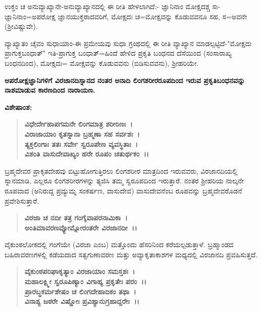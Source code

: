 ಉಕ್ತಂ ಚ ಅನುವ್ಯಾಖ್ಯಾನೇ-ಅನುವ್ಯಾಖ್ಯಾನದಲ್ಲಿ ಈ ರೀತಿ ಹೇಳಲಾಗಿದೆ:- ಜ್ಞಾನಿನಾಂ ಮೋಕ್ಷದಶ್ಚ ಸಃ- ಜ್ಞಾನಿನಾಂ=ಅಪರೋಕ್ಷ ಜ್ಞಾನಯುಕ್ತರಾದವರಿಗೆ, ಮೋಕ್ಷದಃ ಚ=ಮೋಕ್ಷವನ್ನು ಕೊಡುವವನೂ ಸಹ, ಸ=ಅವನೇ (ಶ‍್ರೀವಿಷ್ಣುವೇ).

ವ್ಯಾಖ್ಯಾತಂ ಚೈವಂ ಸುಧಾಯಾಂ-ಈ ಪ್ರಮೇಯವು ಸುಧಾ ಗ್ರಂಥದಲ್ಲಿ ಈ ರೀತಿ ವ್ಯಾಖ್ಯಾನ ಮಾಡಲ್ಪಟ್ಟಿದೆ-"ಮೋಕ್ಷದಃ ಪ್ರಾಗುಕ್ತಬಂಧಾತ್" ಇತಿ-ಪ್ರಾಗುಕ್ತ ಬಂಧಾತ್=ಹಿಂದೆ ಹೇಳಿದ ಪ್ರಕೃತಿ ಬಂಧನದ ದೆಸೆಯಿಂದ (ಸಂಸಾರಾಖ್ಯ ಬಂಧನದಿಂದ), ಮೋಕ್ಷದಃ= ಮೋಕ್ಷವನ್ನು ಕೊಡುವವನು (ಬಿಡಿಸುವವನು), ಶ‍್ರೀಹರಿಯೇ.

\begin{center}
\textbf{ಅಪರೋಕ್ಷಜ್ಞಾನಿಗಳಿಗೆ ವಿರಜಾನದಿಸ್ನಾನದ ನಂತರ ಅನಾದಿ ಲಿಂಗಶರೀರರೂಪದಿಂದ ಇರುವ ಪ್ರಕೃತಿಬಂಧನವನ್ನು ನಾಶಮಾಡುವ ಕಾರಣದಿಂದ ನಾರಾಯಣ.}
\end{center}

\noindent
\textbf{ವಿಶೇಷಾಂಶ:\enginline{-}}

\begin{verse}
\textbf{ವಿಧೇರ್ದೇಹಾಪಗಮನೇ ಲಿಂಗಮಾತ್ರ ಶರೀರಿಣಃ~।}\\\textbf{ವಿರಾಜಾಯಾಂ ಕೃತಸ್ನಾನಾ ಬ್ರಹ್ಮಣಾ ಸಹ ಸರ್ವಶಃ~।}\\\textbf{ತ್ಯಕ್ತಲಿಂಗಾಃ ತತಃ ಸರ್ವೇ ಸ್ವರೂಪೇಣ ವ್ಯವಸ್ಥಿತಾಃ~।}\\\textbf{ವಿಶಂತಿ ವಾಸುದೇವಾಖ್ಯಂ ಹರೇ ರೂಪಂ ಚತುರ್ಥಕಂ~।।}
\end{verse}


ಬ್ರಹ್ಮದೇವರ ಪ್ರಾಕೃತದೇಹವು ಬಿಟ್ಟುಹೋಗುತ್ತಿರಲು ಲಿಂಗಶರೀರ ಮಾತ್ರದಿಂದ ಇರುವವರು, ವಿರಜಾನದಿಯಲ್ಲಿ ಸ್ನಾನಮಾಡಿ, ಎಲ್ಲರೂ ಲಿಂಗಶರೀರಗಳನ್ನು ತ್ಯಜಿಸಿ ತಮ್ಮ ಸ್ವರೂಪ\-ದಿಂದ ಇರುತ್ತಾರೆ. ನಂತರ ಶ‍್ರೀಹರಿಯ ನಾಲ್ಕನೇ ರೂಪವಾದ (ಅನಿರುದ್ದ ಪ್ರದ್ಯುಮ್ನ ಸಂಕರ್ಷಣ, ವಾಸುದೇವ) ವಾಸುದೇವನೆಂಬ ರೂಪವನ್ನು ಬ್ರಹ್ಮದೇವರೊಡನೆ ಪ್ರವೇಶಿಸುತ್ತಾರೆ.

\begin{verse}
\textbf{ವಿರಜಾ ಚ ನದೀ ತತ್ರ ಗಂಗೈವಾಪರನಾಮಿಕಾ~।}\\\textbf{ಅಂತಿಮಾವರಣವ್ಯೋಮ್ನೋರಂತರೇ ವಿರಜಾನದೀ~।।}
\end{verse}


ವೈಕುಂಠಲೋಕದಲ್ಲಿ ಗಂಗೆಯೇ (ವಿರಜಾ ಎಂಬ) ಮತ್ತೊಂದು ಹೆಸರಿನಿಂದ ಕರೆಯಲ್ಪಡು\-ತ್ತಾಳೆ. ಬ್ರಹ್ಮಾಂಡದ ಬಹಿರಾವರಣಗಳಲ್ಲಿ ಕಡೆಯದಾದ ಸತ್ವಗುಣಾವರಣ ಮತ್ತು ಅವ್ಯಾಕೃತಾಕಾಶಗಳ ಮಧ್ಯದಲ್ಲಿ ವಿರಜಾನದಿ ಪ್ರವಹಿಸುತ್ತದೆ.

\begin{verse}
\textbf{ವೈಕುಂಠಪರಿಘಾಕೃತ್ಯಾಂ ವಿರಜಾಯಾಂ ಸಮಸ್ತಶಃ~।}\\\textbf{ಮಹಾಲಕ್ಷ್ಮೀ ಸ್ವರೂಪಿಣ್ಯಾಂ ವಿಗಾಹ್ಯ ಪ್ರಕೃತೇಃ ಪರಂ~।।}\\\textbf{ಪ್ರಾರಬ್ಧಕರ್ಮಶೇಷಂ ಚ ಲಿಂಗದೇಹಾದಿಕಂ ತಥಾ~।}\\\textbf{ವಿನಾಶ್ಯ ಜಠರೇ ವಿಷ್ಣೋಃ ಪ್ರವಿಶ್ಯಾನುಗ್ರಹಾದ್ದರೇಃ~।।}
\end{verse}

